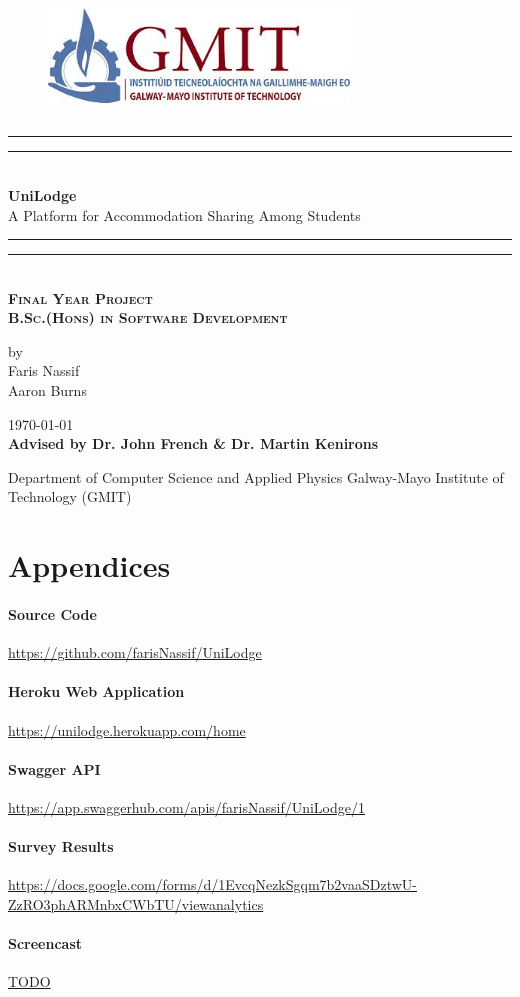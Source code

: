 \documentclass[10pt]{report}
\newcommand*{\customTitle}{\begingroup %
\centering %
\vspace*{\baselineskip} %

\rule{\textwidth}{1.6pt}\vspace*{-\baselineskip}\vspace*{2pt} %
\rule{\textwidth}{0.4pt}\\[\baselineskip] %

{\Large \textbf{UniLodge}  \\[2ex] A Platform for Accommodation Sharing Among Students}\\[0.2\baselineskip] %


\rule{\textwidth}{0.4pt}\vspace*{-\baselineskip}\vspace{3.2pt} %
\rule{\textwidth}{1.6pt}\\[\baselineskip] %
\scshape %
\Large \textbf{Final Year Project}\\
\textbf{B.Sc.(Hons) in Software Development}\par %
\normalsize
\vspace*{2\baselineskip} %


{by \\ Faris Nassif \\ Aaron Burns \par} %


\vspace*{2\baselineskip} %
\vfill %
{\scshape \today} \\[0.3\baselineskip] %


{\textbf{Advised by Dr. John French \& Dr. Martin Kenirons}}\par %

{Department of Computer Science and Applied Physics Galway-Mayo Institute of Technology (GMIT)}\par %


\endgroup}
\begin{document}
 
\begin{figure}
\begin{center}
\includegraphics[width=8cm,height=3.3cm,keepaspectratio]{images/gmit-logo.jpg} %
\end{center}
\end{figure}
\customTitle %
\tableofcontents
\listoffigures
{} 














\appendix
\chapter*{Appendices}
\renewcommand{\thesection}{A.\arabic{section}}

\subsubsection{Source Code}
\url{https://github.com/farisNassif/UniLodge}

\subsubsection{Heroku Web Application}
\url{https://unilodge.herokuapp.com/home}

\subsubsection{Swagger API}
\url{https://app.swaggerhub.com/apis/farisNassif/UniLodge/1}

\subsubsection{Survey Results}
\url{https://docs.google.com/forms/d/1EvcqNezkSgqm7b2vaaSDztwU-ZzRO3phARMnbxCWbTU/viewanalytics}

\subsubsection{Screencast}
\url{TODO}
\end{document}

